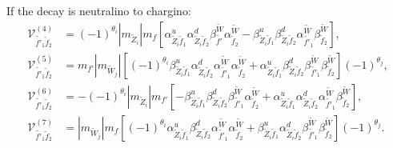 \documentclass[final,3p,times,pdflatex]{elsarticle}
\begin{document}
If the decay is neutralino to chargino:
\begin{align}
\mathcal{V}_{\tilde{f'}_1 \tilde{f}_2}^{(4)} &= (-1)^{\theta_i} |m_{\tilde{Z}_i}|m_{f}\left[\alpha_{\tilde{Z}_i \tilde{f}_1}^{u} \alpha_{\tilde{Z}_i \tilde{f}_2}^{d} \beta_{\tilde{f'}}^{\tilde{W}}\alpha_{\tilde{f}_2}^{\tilde{W}} -  \beta_{\tilde{Z}_i \tilde{f}_1}^{u} \beta_{\tilde{Z}_i \tilde{f}_2}^{d} \alpha_{\tilde{f'}_1}^{\tilde{W}} \beta_{\tilde{f}_2}^{\tilde{W}}\right], \\
\mathcal{V}_{\tilde{f'}_1 \tilde{f}_2}^{(5)} &= m_{f'} |m_{\tilde{W}_j}|\left[(-1)^{\theta_i} \beta_{\tilde{Z}_i \tilde{f}_1}^{u} \alpha_{\tilde{Z}_i \tilde{f}_2}^{d} \alpha_{\tilde{f'}_1}^{\tilde{W}} \alpha_{\tilde{f}_2}^{\tilde{W}} + \alpha_{\tilde{Z}_i \tilde{f}_1}^{u} \beta_{\tilde{Z}_i \tilde{f}_2}^{d} \beta_{\tilde{f'}_1}^{\tilde{W}} \beta_{\tilde{f}_2}^{\tilde{W}}\right](-1)^{\theta_j}, \\
\mathcal{V}_{\tilde{f'}_1 \tilde{f}_2}^{(6)} &= -(-1)^{\theta_i} |m_{\tilde{Z}_i}| m_{f'} \left[-\beta_{\tilde{Z}_i \tilde{f}_1}^{u} \beta_{\tilde{Z}_i \tilde{f}_2}^{d} \beta_{\tilde{f'}_1}^{\tilde{W}} \alpha_{\tilde{f}_2}^{\tilde{W}} +  \alpha_{\tilde{Z}_i \tilde{f}_1}^{u} \alpha_{\tilde{Z}_i \tilde{f}_2}^{d} \alpha_{\tilde{f'}_1}^{\tilde{W}} \beta_{\tilde{f}_2}^{\tilde{W}}\right], \\
\mathcal{V}_{\tilde{f'}_1 \tilde{f}_2}^{(7)} &= |m_{\tilde{W}_j}|m_{f}\left[(-1)^{\theta_i} \alpha_{\tilde{Z}_i \tilde{f}_1}^{u} \beta_{\tilde{Z}_i \tilde{f}_2}^{d} \alpha_{\tilde{f'}_1}^{\tilde{W}} \alpha_{\tilde{f}_2}^{\tilde{W}} + \beta_{\tilde{Z}_i \tilde{f}_1}^{u} \alpha_{\tilde{Z}_i \tilde{f}_2}^{d} \beta_{\tilde{f'}_1}^{\tilde{W}} \beta_{\tilde{f}_2}^{\tilde{W}}\right](-1)^{\theta_j}.
\end{align}
\end{document}
